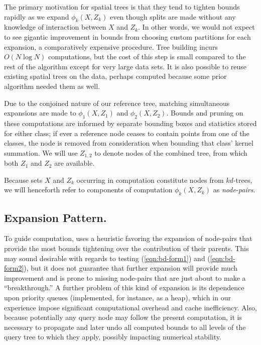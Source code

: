 \documentclass[twoside,leqno,twocolumn]{article}
\begin{document}
The primary motivation for spatial trees is that they tend to tighten
bounds rapidly as we expand $\phi_k(X,Z_k)$ even though splits are
made without any knowledge of interaction between $X$ and $Z_k$.  In
other words, we would not expect to see gigantic improvement in bounds
from choosing custom partitions for each expansion, a comparatively
expensive procedure.  Tree building incurs $O(N \log N)$ computations,
but the cost of this step is small compared to the rest of the
algorithm except for very large data sets.  It is also possible to
reuse existing spatial trees on the data, perhaps computed because
some prior algorithm needed them as well.

Due to the conjoined nature of our reference tree, matching
simultaneous expansions are made to $\phi_1(X,Z_1)$ and
$\phi_2(X,Z_2)$.  Bounds and pruning on these computations are
informed by separate bounding boxes and statistics stored for either
class; if ever a reference node ceases to contain points from one of
the classes, the node is removed from consideration when bounding that
class' kernel summation.  We will use $Z_{1,2}$ to denote nodes of the
combined tree, from which both $Z_1$ and $Z_2$ are available.

Because sets $X$ and $Z_k$ occurring in computation constitute nodes
from $kd$-trees, we will henceforth refer to components of computation
$\phi_k(X,Z_k)$ as {\em node-pairs}.

\subsection{Expansion Pattern.}
To guide computation, \cite{nbc-compstat} uses a heuristic favoring
the expansion of node-pairs that provide the most bounds tightening
over the contribution of their parents.  This may sound desirable with
regards to testing (\ref{eqn:bd-form1}) and (\ref{eqn:bd-form2}), but
it does not guarantee that further expansion will provide much
improvement and is prone to missing node-pairs that are just about to
make a ``breakthrough.''  A further problem of this kind of expansion
is its dependence upon priority queues (implemented, for instance, as
a heap), which in our experience impose significant computational
overhead and cache inefficiency.  Also, because potentially any query
node may follow the present computation, it is necessary to propagate
and later undo all computed bounds to all levels of the query tree to
which they apply, possibly impacting numerical stability.
\end{document}
